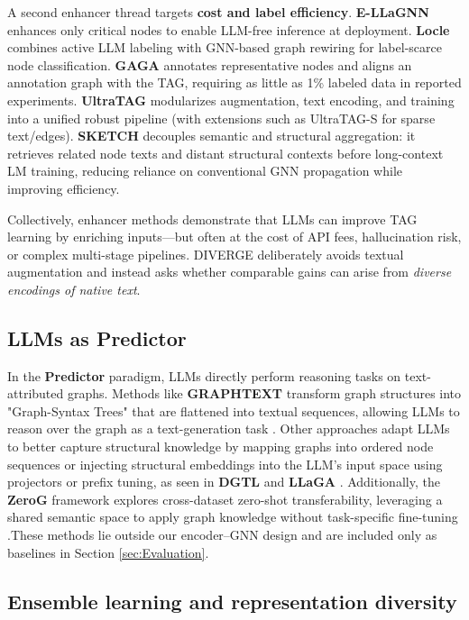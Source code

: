 \documentclass[a4paper,fleqn]{cas-sc}
\begin{document}
A second enhancer thread targets \textbf{cost and label efficiency}. \textbf{E-LLaGNN} \citep{Jaiswal2024AllAgainstSome} enhances only critical nodes to enable LLM-free inference at deployment. \textbf{Locle} \citep{zhang2025leveraging} combines active LLM labeling with GNN-based graph rewiring for label-scarce node classification. \textbf{GAGA} \citep{hu2025gaga} annotates representative nodes and aligns an annotation graph with the TAG, requiring as little as 1\% labeled data in reported experiments. \textbf{UltraTAG} \citep{yu2025ultratag} modularizes augmentation, text encoding, and training into a unified robust pipeline (with extensions such as UltraTAG-S for sparse text/edges). \textbf{SKETCH} \citep{zhou-etal-2025sketch} decouples semantic and structural aggregation: it retrieves related node texts and distant structural contexts before long-context LM training, reducing reliance on conventional GNN propagation while improving efficiency.

Collectively, enhancer methods demonstrate that LLMs can improve TAG learning by enriching inputs---but often at the cost of API fees, hallucination risk, or complex multi-stage pipelines. DIVERGE deliberately avoids textual augmentation and instead asks whether comparable gains can arise from \emph{diverse encodings of native text}.

\subsection{LLMs as Predictor}
In the \textbf{Predictor} paradigm, LLMs directly perform reasoning tasks on text-attributed graphs. Methods like \textbf{GRAPHTEXT} transform graph structures into "Graph-Syntax Trees" that are flattened into textual sequences, allowing LLMs to reason over the graph as a text-generation task \citep{Zhao2024GraphText}. Other approaches adapt LLMs to better capture structural knowledge by mapping graphs into ordered node sequences or injecting structural embeddings into the LLM's input space using projectors or prefix tuning, as seen in \textbf{DGTL} \citep{Qin2024DisentangledTAG} and \textbf{LLaGA} \citet{Chen2024LLaGA}. Additionally, the \textbf{ZeroG} framework explores cross-dataset zero-shot transferability, leveraging a shared semantic space to apply graph knowledge without task-specific fine-tuning \citep{Li2024ZeroG}.These methods lie outside our encoder–GNN
design and are included only as baselines in Section \ref{sec:Evaluation}.

\subsection{Ensemble learning and representation diversity}
\end{document}
